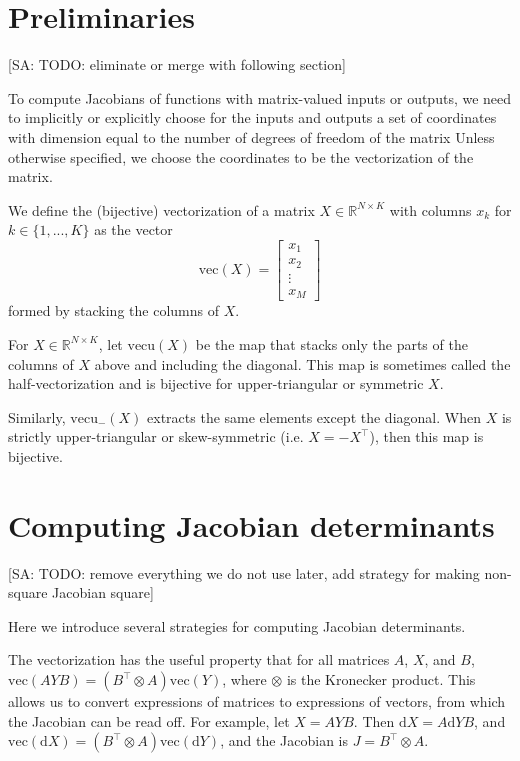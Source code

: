 \documentclass[11pt]{article}
\newcommand{\dv}[1]{\mathrm{d}{#1}}
\newcommand{\vect}{\mathrm{vec}}
\newcommand{\vectu}{\mathrm{vecu}}
\begin{document}
\section{Preliminaries}

[SA: TODO: eliminate or merge with following section]

To compute Jacobians of functions with matrix-valued inputs or outputs, we need to implicitly or explicitly choose for the inputs and outputs a set of coordinates with dimension equal to the number of degrees of freedom of the matrix
Unless otherwise specified, we choose the coordinates to be the vectorization of the matrix.

We define the (bijective) vectorization of a matrix $X \in \mathbb{R}^{N \times K}$ with columns $x_k$ for $k \in \{1, ..., K\}$ as the vector
\[\vect(X) = \begin{bmatrix}x_1 \\ x_2 \\ \vdots \\ x_M\end{bmatrix}\]
formed by stacking the columns of $X$.

For $X \in \mathbb{R}^{N \times K}$, let $\vectu(X)$ be the map that stacks only the parts of the columns of $X$ above and including the diagonal.
This map is sometimes called the half-vectorization and is bijective for upper-triangular or symmetric $X$.

Similarly, $\vectu_-(X)$ extracts the same elements except the diagonal.
When $X$ is strictly upper-triangular or skew-symmetric (i.e. $X = -X^\top$), then this map is bijective.

\section{Computing Jacobian determinants}

[SA: TODO: remove everything we do not use later, add strategy for making non-square Jacobian square]

Here we introduce several strategies for computing Jacobian determinants.

The vectorization has the useful property that for all matrices $A$, $X$, and $B$, $\vect(AYB) = (B^\top \otimes A) \vect(Y)$, where $\otimes$ is the Kronecker product.
This allows us to convert expressions of matrices to expressions of vectors, from which the Jacobian can be read off.
For example, let $X = AYB$. Then $\dv{X} = A \dv{Y} B$, and $\vect(\dv{X}) = (B^\top \otimes A) \vect(\dv{Y})$, and the Jacobian is $J = B^\top \otimes A$.
\end{document}
